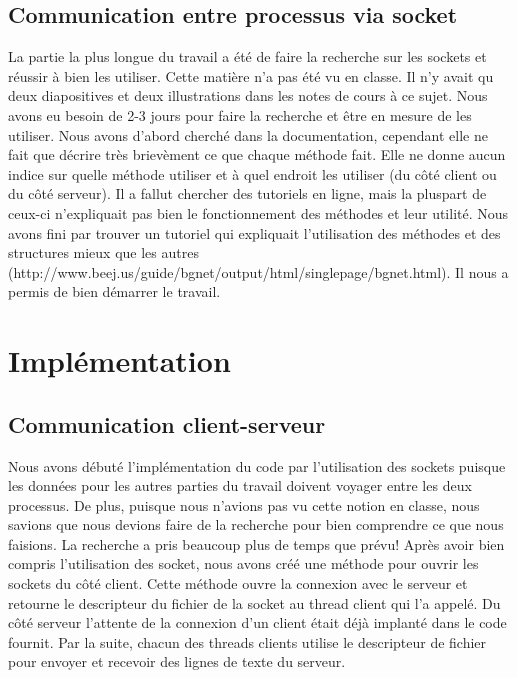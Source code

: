 \documentclass{article}
\begin{document}
\subsection{Communication entre processus via socket}

La partie la plus longue du travail a été de faire la recherche sur les sockets 
et réussir à bien les utiliser. Cette matière n'a pas été vu en classe. Il n'y 
avait qu deux diapositives et deux illustrations dans les notes de cours à ce sujet.
Nous avons eu besoin de 2-3 jours pour faire la recherche et être en mesure de les 
utiliser. Nous avons d'abord cherché dans la documentation, cependant elle ne fait 
que décrire très brievèment ce que chaque méthode fait. Elle ne donne aucun indice 
sur quelle méthode utiliser et à quel endroit les utiliser (du côté client ou du 
côté serveur). Il a fallut chercher des tutoriels en ligne, mais la pluspart de 
ceux-ci n'expliquait pas bien le fonctionnement des méthodes et leur utilité. Nous 
avons fini par trouver un tutoriel qui expliquait l'utilisation des méthodes et des 
structures mieux que les autres (http://www.beej.us/guide/bgnet/output/html/singlepage/bgnet.html).
Il nous a permis de bien démarrer le travail.


\section{Implémentation}

\subsection{Communication client-serveur}

Nous avons débuté l'implémentation du code par l'utilisation des sockets puisque les 
données pour les autres parties du travail doivent voyager entre les deux processus. 
De plus, puisque nous n'avions pas vu cette notion en classe, nous savions que nous 
devions faire de la recherche pour bien comprendre ce que nous faisions. La recherche 
a pris beaucoup plus de temps que prévu! Après avoir bien compris l'utilisation des socket, 
nous avons créé une méthode pour ouvrir les sockets du côté client. Cette méthode ouvre 
la connexion avec le serveur et retourne le descripteur du fichier de la socket au thread 
client qui l'a appelé. Du côté serveur l'attente de la connexion d'un client était déjà 
implanté dans le code fournit. Par la suite, chacun des threads clients utilise le descripteur 
de fichier pour envoyer et recevoir des lignes de texte du serveur. 
\end{document}

